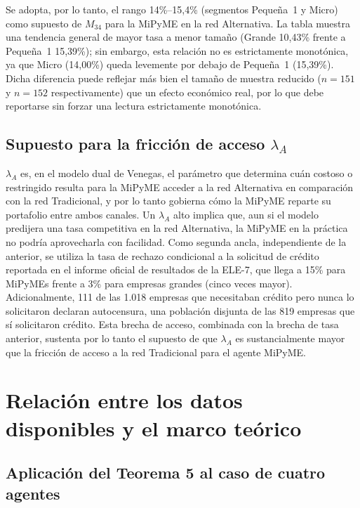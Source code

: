 \documentclass[11pt]{article}
\begin{document}
Se adopta, por lo tanto, el rango 14\%--15,4\% (segmentos Pequeña~1 y Micro) como supuesto de $M_{34}$ para la MiPyME en la red Alternativa. La tabla muestra una tendencia general de mayor tasa a menor tamaño (Grande 10,43\% frente a Pequeña~1 15,39\%); sin embargo, esta relación no es estrictamente monotónica, ya que Micro (14,00\%) queda levemente por debajo de Pequeña~1 (15,39\%). Dicha diferencia puede reflejar más bien el tamaño de muestra reducido ($n=151$ y $n=152$ respectivamente) que un efecto económico real, por lo que debe reportarse sin forzar una lectura estrictamente monotónica.

\subsection{Supuesto para la fricción de acceso $\lambda_A$}

$\lambda_A$ es, en el modelo dual de Venegas, el parámetro que determina cuán costoso o restringido resulta para la MiPyME acceder a la red Alternativa en comparación con la red Tradicional, y por lo tanto gobierna cómo la MiPyME reparte su portafolio entre ambos canales. Un $\lambda_A$ alto implica que, aun si el modelo predijera una tasa competitiva en la red Alternativa, la MiPyME en la práctica no podría aprovecharla con facilidad. Como segunda ancla, independiente de la anterior, se utiliza la tasa de rechazo condicional a la solicitud de crédito reportada en el informe oficial de resultados de la ELE-7, que llega a 15\% para MiPyMEs frente a 3\% para empresas grandes (cinco veces mayor). Adicionalmente, 111 de las 1.018 empresas que necesitaban crédito pero nunca lo solicitaron declaran autocensura, una población disjunta de las 819 empresas que sí solicitaron crédito. Esta brecha de acceso, combinada con la brecha de tasa anterior, sustenta por lo tanto el supuesto de que $\lambda_A$ es sustancialmente mayor que la fricción de acceso a la red Tradicional para el agente MiPyME.

\section{Relación entre los datos disponibles y el marco teórico}
\label{sec:relacion-teoria-datos}

\subsection{Aplicación del Teorema 5 al caso de cuatro agentes}
\end{document}
